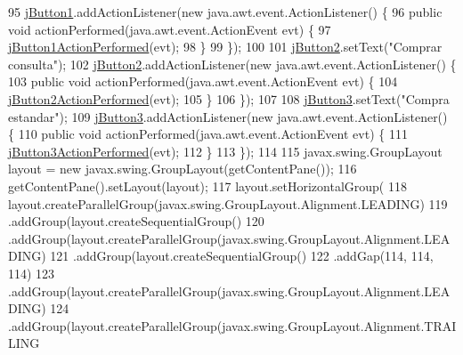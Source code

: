 \begin{DoxyCode}
95         \mbox{\hyperlink{class_interfaz_package_1_1_verificar_libro_a5795c2ef06a892f54b964cccdaa87bac}{jButton1}}.addActionListener(\textcolor{keyword}{new} java.awt.event.ActionListener() \{
96             \textcolor{keyword}{public} \textcolor{keywordtype}{void} actionPerformed(java.awt.event.ActionEvent evt) \{
97                 \mbox{\hyperlink{class_interfaz_package_1_1_verificar_libro_a1e2ce8da1553133da46ea787b2e793c1}{jButton1ActionPerformed}}(evt);
98             \}
99         \});
100 
101         \mbox{\hyperlink{class_interfaz_package_1_1_verificar_libro_a35a502b6b4c12dee0f50c5409271d275}{jButton2}}.setText(\textcolor{stringliteral}{"Comprar consulta"});
102         \mbox{\hyperlink{class_interfaz_package_1_1_verificar_libro_a35a502b6b4c12dee0f50c5409271d275}{jButton2}}.addActionListener(\textcolor{keyword}{new} java.awt.event.ActionListener() \{
103             \textcolor{keyword}{public} \textcolor{keywordtype}{void} actionPerformed(java.awt.event.ActionEvent evt) \{
104                 \mbox{\hyperlink{class_interfaz_package_1_1_verificar_libro_a15b0fbfa1b64f9124a429e4ea8075241}{jButton2ActionPerformed}}(evt);
105             \}
106         \});
107 
108         \mbox{\hyperlink{class_interfaz_package_1_1_verificar_libro_a71325c9a930cd968c2b6ce4abc7e8129}{jButton3}}.setText(\textcolor{stringliteral}{"Compra estandar"});
109         \mbox{\hyperlink{class_interfaz_package_1_1_verificar_libro_a71325c9a930cd968c2b6ce4abc7e8129}{jButton3}}.addActionListener(\textcolor{keyword}{new} java.awt.event.ActionListener() \{
110             \textcolor{keyword}{public} \textcolor{keywordtype}{void} actionPerformed(java.awt.event.ActionEvent evt) \{
111                 \mbox{\hyperlink{class_interfaz_package_1_1_verificar_libro_ab0bc4b49fa212e8da0ca24828257116d}{jButton3ActionPerformed}}(evt);
112             \}
113         \});
114 
115         javax.swing.GroupLayout layout = \textcolor{keyword}{new} javax.swing.GroupLayout(getContentPane());
116         getContentPane().setLayout(layout);
117         layout.setHorizontalGroup(
118             layout.createParallelGroup(javax.swing.GroupLayout.Alignment.LEADING)
119             .addGroup(layout.createSequentialGroup()
120                 .addGroup(layout.createParallelGroup(javax.swing.GroupLayout.Alignment.LEADING)
121                     .addGroup(layout.createSequentialGroup()
122                         .addGap(114, 114, 114)
123                         .addGroup(layout.createParallelGroup(javax.swing.GroupLayout.Alignment.LEADING)
124                             .addGroup(layout.createParallelGroup(javax.swing.GroupLayout.Alignment.TRAILING

\end{DoxyCode}
